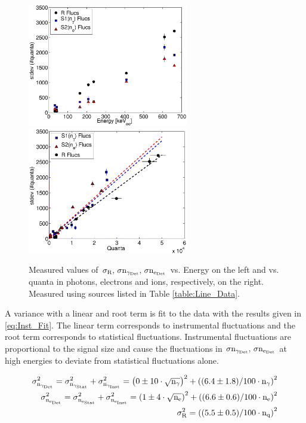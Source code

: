 \renewcommand{\baselinestretch}{1}
\small\normalsize
 \begin{figure}[h!]\centering
\includegraphics[width=70mm]{Chapter_Flucs/Figures/fluc_E.eps}
\includegraphics[width=70mm]{Chapter_Flucs/Figures/fluc_Q.eps}
\caption{Measured values of $\rm \sigma_R, \, \sigma n_{\gamma_{Det}}, \,\sigma n_{e_{Det}} $ vs. Energy on the left and vs. quanta in photons, electrons and ions, respectively,  on the right. Measured using sources listed in Table \ref{table:Line_Data}. }
\label{fig:Flucs}
\end{figure}
\renewcommand{\baselinestretch}{2}
\small\normalsize

A variance with a linear and root term is fit to the data with the results given in \ref{eq:Inst_Fit}. The linear term corresponds to instrumental fluctuations and the root term corresponds to statistical fluctuations. Instrumental fluctuations are proportional to the signal size and cause the fluctuations in $\rm \sigma n_{\gamma_{Det}}, \,\sigma n_{e_{Det}} $ at high energies to deviate from statistical fluctuations alone. 

\begin{equation}
\begin{split}
\rm  \sigma_{n_{\gamma_{Det}}}^2 = \sigma_{n_{\gamma_{Stat}}}^2 + \sigma_{n_{\gamma_{Inst}}}^2 =\left(0 \pm10\cdot \sqrt{n_\gamma}\right)^2 + \left((6.4\pm1.8)/100\cdot n_\gamma\right)^2 \\
\rm \sigma_{n_{e_{Det}}}^2 = \sigma_{n_{e_{Stat}}}^2 + \sigma_{n_{e_{Inst}}}^2 = \left(1\pm4\cdot \sqrt{n_e}\right)^2 + \left((6.6\pm0.6)/100\cdot n_e\right)^2 \\
\rm \sigma_R^2=   \left((5.5\pm0.5)/100\cdot n_q\right)^2
\label{eq:Inst_Fit}
\end{split}
\end{equation}

